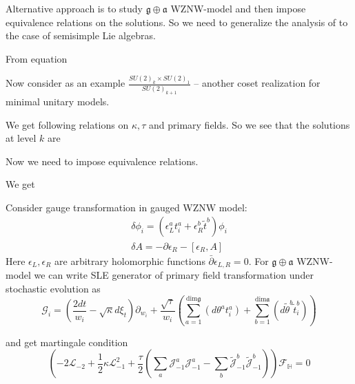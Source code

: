 \documentclass[12pt]{article}
\theoremstyle{definition}
\newcommand{\gf}{\mathfrak{g}}
\newcommand{\af}{\mathfrak{a}}
\theoremstyle{definition} \newtheorem{Def}{Definition}
\begin{document}
Alternative approach is to study $\gf\oplus \af$ WZNW-model and then impose equivalence relations on the solutions. 
So we need to generalize the analysis of \cite{alekseev2010sle} to the case of semisimple Lie algebras. 

From equation 

Now consider as an example $\frac{SU(2)_{k}\times SU(2)_{1}}{SU(2)_{k+1}}$ -- another coset realization for minimal unitary models. 

We get following relations on $\kappa,\tau$ and primary fields. So we see that the solutions at level $k$ are 

Now we need to impose equivalence relations.


We get 


Consider gauge transformation in gauged WZNW model:
\begin{eqnarray*}
  \delta \phi_{i}=(\epsilon_{L}^{a} t^{a}_{i}+\epsilon^{b}_{R}\tilde{t}^{b})\phi_{i}\\
  \delta A = -\partial \epsilon_{R}-[\epsilon_{R},A]
\end{eqnarray*}
Here $\epsilon_{L}, \epsilon_{R}$ are arbitrary holomorphic functions $\bar\partial\epsilon_{L,R}=0$. 
For  $\gf\oplus \af$ WZNW-model we can write SLE generator of primary field transformation under stochastic evolution as
\begin{equation*}
  \mathcal{G}_{i}=\left(\frac{2dt}{w_{i}}-\sqrt{\kappa} d\xi_{t}\right) \partial_{w_{i}}+\frac{\sqrt{\tau}}{w_{i}}\left(\sum_{a=1}^{\mathrm{dim} \gf}\left(d \theta ^{a} t^{a}_{i}\right)+\sum_{b=1}^{\mathrm{dim} \af}\left(d \tilde{\theta} ^{b} \tilde{t}^{b}_{i}\right)\right)
\end{equation*}

and get martingale condition
\begin{equation*}
  \left(-2 \mathcal{L}_{-2}+\frac{1}{2}\kappa \mathcal{L}_{-1}^{2}+\frac{\tau}{2}\left( \sum_{a} \mathcal{J}^{a}_{-1} \mathcal{J}^{a}_{-1}-
      \sum_{b}\tilde{\mathcal{J}}^{b}_{-1} \tilde{\mathcal{J}}^{b}_{-1}\right)\right)        \mathcal{F}_{\mathbb{H}}=0
\end{equation*}
\end{document}
